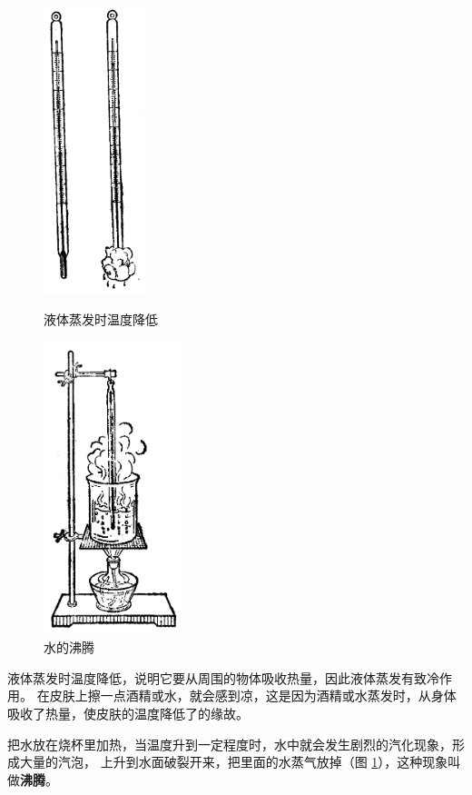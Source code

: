 \begin{figure}[htbp]
    \centering
    \begin{minipage}{7cm}
    \centering
    \includegraphics[width=3cm]{../pic/czwl2-ch4-3}
    \caption{液体蒸发时温度降低}\label{fig:4-3}
    \end{minipage}
    \qquad
    \begin{minipage}{7cm}
    \centering
    \includegraphics[width=4cm]{../pic/czwl2-ch4-4}
    \caption{水的沸腾}\label{fig:4-4}
    \end{minipage}
\end{figure}

液体蒸发时温度降低，说明它要从周围的物体吸收热量，因此液体蒸发有致冷作用。
在皮肤上擦一点酒精或水，就会感到凉，这是因为酒精或水蒸发时，从身体吸收了热量，使皮肤的温度降低了的缘故。




把水放在烧杯里加热，当温度升到一定程度时，水中就会发生剧烈的汽化现象，形成大量的汽泡，
上升到水面破裂开来，把里面的水蒸气放掉（图 \ref{fig:4-4}），这种现象叫做\textbf{沸腾}。

